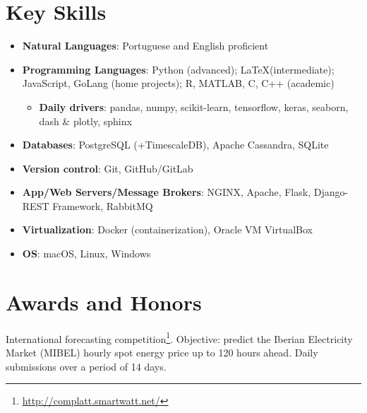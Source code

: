 \documentclass{mycv}
\begin{document}
\section{Key Skills}

\begin{itemize}[itemsep=5px]
	
	\item \textbf{Natural Languages}: Portuguese and English proficient
	
	\item \textbf{Programming Languages}: Python (advanced); \LaTeX (intermediate); JavaScript, GoLang (home projects); R, MATLAB, C, C++ (academic)
	
	\begin{itemize}
		\item \textbf{Daily drivers}: pandas, numpy, scikit-learn, tensorflow, keras, seaborn, dash \& plotly, sphinx
	\end{itemize}
	
	
	\item \textbf{Databases}: PostgreSQL (+TimescaleDB), Apache Cassandra, SQLite
	
	\item \textbf{Version control}: Git, GitHub/GitLab
	
	\item \textbf{App/Web Servers/Message Brokers}: NGINX, Apache, Flask, Django-REST Framework, RabbitMQ
	
	\item \textbf{Virtualization}: Docker (containerization), Oracle VM VirtualBox
	
	\item \textbf{OS}: macOS, Linux, Windows
	
	
\end{itemize}


\vspace{0.4cm}

\section{Awards and Honors}



International forecasting competition\footnote{\url{http://complatt.smartwatt.net/}}. Objective: predict the Iberian Electricity Market (MIBEL) hourly spot energy price up to 120 hours ahead. Daily submissions over a period of 14 days.
\end{document}

